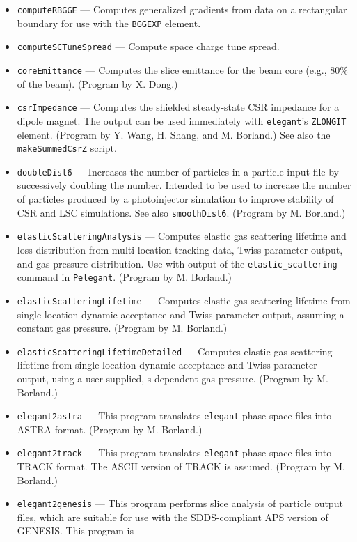 \documentclass[11pt]{article}
\begin{document}
\begin{itemize}
\item {\tt computeRBGGE} --- Computes generalized gradients from data on a rectangular boundary 
  for use with the \verb|BGGEXP| element.
\item {\tt computeSCTuneSpread} --- Compute space charge tune spread.
\item {\tt coreEmittance} --- Computes the slice emittance for the beam core (e.g., 80\% of the beam).
  (Program by X. Dong.)
\item {\tt csrImpedance} --- Computes the shielded steady-state CSR impedance for a dipole magnet.
 The output can be used immediately with {\tt elegant}'s \verb|ZLONGIT| element.
 (Program by Y. Wang, H. Shang, and M. Borland.)
 See also the {\tt makeSummedCsrZ} script.
\item {\tt doubleDist6} --- Increases the number of particles in a particle input file by
 successively doubling the number.  Intended to be used to increase the number of particles
 produced by a photoinjector simulation to improve stability of CSR and LSC simulations.
 See also {\tt smoothDist6}.
  (Program by M. Borland.)
\item {\tt elasticScatteringAnalysis} --- Computes elastic gas scattering lifetime and loss distribution from
  multi-location tracking data, Twiss parameter output, and gas pressure distribution. Use with output of the
  \verb|elastic_scattering| command in \verb|Pelegant|.
  (Program by M. Borland.)
\item {\tt elasticScatteringLifetime} --- Computes elastic gas scattering lifetime from single-location 
  dynamic acceptance and Twiss parameter output, assuming a constant gas pressure.
  (Program by M. Borland.)
\item {\tt elasticScatteringLifetimeDetailed} --- Computes elastic gas scattering lifetime from single-location 
  dynamic acceptance and Twiss parameter output, using a user-supplied, s-dependent gas pressure.
  (Program by M. Borland.)
\item {\tt elegant2astra} --- This program translates {\tt elegant} phase space files into ASTRA \cite{ASTRA} format.
  (Program by M. Borland.)
\item {\tt elegant2track} --- This program translates {\tt elegant} phase space files into TRACK \cite{TRACK} format.
  The ASCII version of TRACK is assumed.
  (Program by M. Borland.)
\item {\tt elegant2genesis} --- This program performs
        slice analysis of particle output files, which are suitable for use with
        the SDDS-compliant APS version of GENESIS\cite{GENESIS}.  This program is

\end{itemize}
\end{document}
